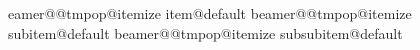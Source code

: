 
\DefaultMathsDigits
















\let\olddocument\document
\let\endolddocument\enddocument

\makeatletter
\renewenvironment{document}{
	\olddocument
	\baselineskip = .8cm
}{%
	\endolddocument
}%
\makeatother

\setlength{\baselineskipVar}{0.9cm}



\makeatletter
\expandafter\let\csname beamer@@tmpop@itemize item@default\endcsname\relax
\expandafter\let\csname beamer@@tmpop@itemize subitem@default\endcsname\relax
\expandafter\let\csname beamer@@tmpop@itemize subsubitem@default\endcsname\relax

